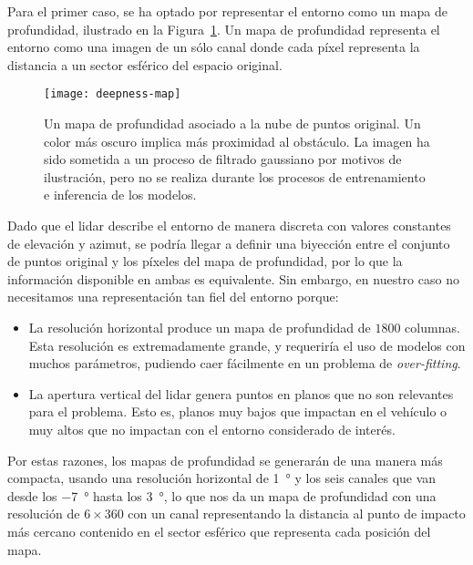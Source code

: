 Para el primer caso, se ha optado por representar el entorno como un mapa de profundidad, ilustrado en la Figura~\ref{fig:deepmap-example}. Un mapa de profundidad representa el entorno como una imagen de un sólo canal donde cada píxel representa la distancia a un sector esférico del espacio original.

\begin{figure}
	\centering
	\texttt{[image: deepness-map]}
	\caption[Mapa de profundidad de ejemplo]{Un mapa de profundidad asociado a la nube de puntos original. Un color más oscuro implica más proximidad al obstáculo. La imagen ha sido sometida a un proceso de filtrado gaussiano por motivos de ilustración, pero no se realiza durante los procesos de entrenamiento e inferencia de los modelos.}
	\label{fig:deepmap-example}
\end{figure}

Dado que el \acrshort{lidar} describe el entorno de manera discreta con valores constantes de elevación y azimut, se podría llegar a definir una biyección entre el conjunto de puntos original y los píxeles del mapa de profundidad, por lo que la información disponible en ambas es equivalente. Sin embargo, en nuestro caso no necesitamos una representación tan fiel del entorno porque:

\begin{itemize}
	\item La resolución horizontal produce un mapa de profundidad de $1800$ columnas. Esta resolución es extremadamente grande, y requeriría el uso de modelos con muchos parámetros, pudiendo caer fácilmente en un problema de \textit{over-fitting}.
	\item La apertura vertical del \acrshort{lidar} genera puntos en planos que no son relevantes para el problema. Esto es, planos muy bajos que impactan en el vehículo o muy altos que no impactan con el entorno considerado de interés.
\end{itemize}

Por estas razones, los mapas de profundidad se generarán de una manera más compacta, usando una resolución horizontal de \SI{1}{\degree} y los seis canales que van desde los \SI{-7}{\degree} hasta los \SI{3}{\degree}, lo que nos da un mapa de profundidad con una resolución de $6 \times 360$ con un canal representando la distancia al punto de impacto más cercano contenido en el sector esférico que representa cada posición del mapa.

